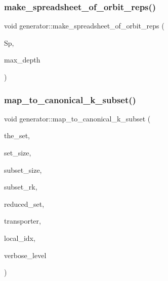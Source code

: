 \subsubsection{\texorpdfstring{make\+\_\+spreadsheet\+\_\+of\+\_\+orbit\+\_\+reps()}{make\_spreadsheet\_of\_orbit\_reps()}}
{\footnotesize\ttfamily void generator\+::make\+\_\+spreadsheet\+\_\+of\+\_\+orbit\+\_\+reps (\begin{DoxyParamCaption}\item[{\mbox{\hyperlink{classspreadsheet}{spreadsheet}} $\ast$\&}]{Sp,  }\item[{\mbox{\hyperlink{galois_8h_a09fddde158a3a20bd2dcadb609de11dc}{I\+NT}}}]{max\+\_\+depth }\end{DoxyParamCaption})}

\mbox{\label{classgenerator_acb86c3093119ba960ff942427d86f4e6}} 
\subsubsection{\texorpdfstring{map\+\_\+to\+\_\+canonical\+\_\+k\+\_\+subset()}{map\_to\_canonical\_k\_subset()}}
{\footnotesize\ttfamily void generator\+::map\+\_\+to\+\_\+canonical\+\_\+k\+\_\+subset (\begin{DoxyParamCaption}\item[{\mbox{\hyperlink{galois_8h_a09fddde158a3a20bd2dcadb609de11dc}{I\+NT}} $\ast$}]{the\+\_\+set,  }\item[{\mbox{\hyperlink{galois_8h_a09fddde158a3a20bd2dcadb609de11dc}{I\+NT}}}]{set\+\_\+size,  }\item[{\mbox{\hyperlink{galois_8h_a09fddde158a3a20bd2dcadb609de11dc}{I\+NT}}}]{subset\+\_\+size,  }\item[{\mbox{\hyperlink{galois_8h_a09fddde158a3a20bd2dcadb609de11dc}{I\+NT}}}]{subset\+\_\+rk,  }\item[{\mbox{\hyperlink{galois_8h_a09fddde158a3a20bd2dcadb609de11dc}{I\+NT}} $\ast$}]{reduced\+\_\+set,  }\item[{\mbox{\hyperlink{galois_8h_a09fddde158a3a20bd2dcadb609de11dc}{I\+NT}} $\ast$}]{transporter,  }\item[{\mbox{\hyperlink{galois_8h_a09fddde158a3a20bd2dcadb609de11dc}{I\+NT}} \&}]{local\+\_\+idx,  }\item[{\mbox{\hyperlink{galois_8h_a09fddde158a3a20bd2dcadb609de11dc}{I\+NT}}}]{verbose\+\_\+level }\end{DoxyParamCaption})}

